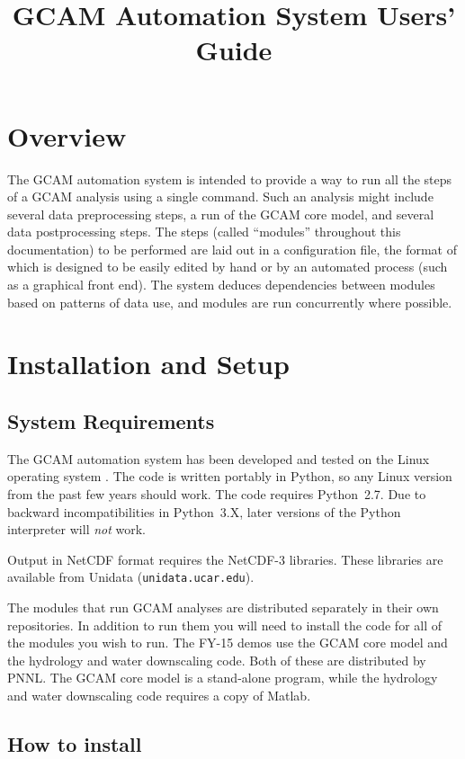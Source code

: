 \documentclass[11pt]{article}
\title{{GCAM} Automation System Users' Guide}
\begin{document}
\maketitle

\section{Overview}
The GCAM automation system is intended to provide a way to run all the
steps of a GCAM analysis using a single command.  Such an analysis
might include several data preprocessing steps, a run of the GCAM core
model, and several data postprocessing steps.  The steps (called
``modules'' throughout this documentation) to be performed are laid
out in a configuration file, the format of which is designed to be
easily edited by hand or by an automated process (such as a graphical
front end).  The system deduces dependencies between modules based on
patterns of data use, and modules are run concurrently where possible.


\section{Installation and Setup}
\subsection{System Requirements}

The GCAM automation system has been developed and tested on the Linux
operating system .  The code is written portably in Python, so any
Linux version
from the past few years should work.  The code
requires Python~2.7.  Due to backward incompatibilities in Python~3.X,
later versions of the Python interpreter will \emph{not} work.

Output in NetCDF format requires the NetCDF-3 libraries.  These
libraries are available from Unidata (\texttt{unidata.ucar.edu}).

The modules that run GCAM analyses are distributed separately in their
own repositories.  In addition to run them you will need to install
the code for all of the modules you wish to run.  The FY-15 demos use
the GCAM core model and the hydrology and water downscaling code.
Both of these are distributed by PNNL.  The GCAM core model is a
stand-alone program, while the hydrology and water downscaling code
requires a copy of Matlab.

\subsection{How to install}
\end{document}
